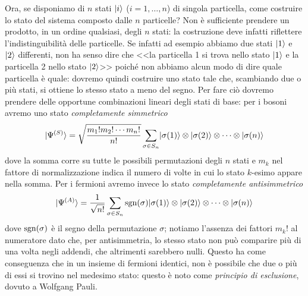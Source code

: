 Ora, se disponiamo di $n$ stati $\lvert i\rangle$ ($i=1,\ldots,n$) di singola particella, come costruire lo stato del sistema composto dalle $n$ particelle?
Non è sufficiente prendere un prodotto, in un ordine qualsiasi, degli $n$ stati: la costruzione deve infatti riflettere l'indistinguibilità delle particelle.
Se infatti ad esempio abbiamo due stati $\lvert1\rangle$ e $\lvert2\rangle$ differenti, non ha senso dire che <<la particella 1 si trova nello stato $\lvert1\rangle$ e la particella 2 nello stato $\lvert2\rangle$>> poich\'e non abbiamo alcun modo di dire quale particella è quale: dovremo quindi costruire uno stato tale che, scambiando due o più stati, si ottiene lo stesso stato a meno del segno.
Per fare ciò dovremo prendere delle opportune combinazioni lineari degli stati di base: per i bosoni avremo uno stato \emph{completamente simmetrico}
\begin{equation}
    \lvert\Psi^{(S)}\rangle=\sqrt{\frac{m_1!m_2!\cdots m_n!}{n!}}\sum_{\sigma\in S_n}\lvert\sigma(1)\rangle\otimes\lvert\sigma(2)\rangle\otimes\cdots\otimes\lvert\sigma(n)\rangle
    \label{eq:stato-completamente-simmetrico}
\end{equation}
dove la somma corre su tutte le possibili permutazioni degli $n$ stati e $m_k$ nel fattore di normalizzazione indica il numero di volte in cui lo stato $k$-esimo appare nella somma.
Per i fermioni avremo invece lo stato \emph{completamente antisimmetrico}
\begin{equation}
    \lvert\Psi^{(A)}\rangle=\frac1{\sqrt{n!}}\sum_{\sigma\in S_n}\operatorname{sgn}(\sigma)\lvert\sigma(1)\rangle\otimes\lvert\sigma(2)\rangle\otimes\cdots\otimes\lvert\sigma(n)\rangle
    \label{eq:stato-completamente-antisimmetrico}
\end{equation}
dove $\operatorname{sgn}(\sigma)$ è il segno della permutazione $\sigma$; notiamo l'assenza dei fattori $m_k!$ al numeratore dato che, per antisimmetria, lo stesso stato non può comparire più di una volta negli addendi, che altrimenti sarebbero nulli.
Questo ha come conseguenza che in un insieme di fermioni identici, non è possibile che due o più di essi si trovino nel medesimo stato: questo è noto come \emph{principio di esclusione}, dovuto a Wolfgang Pauli.

